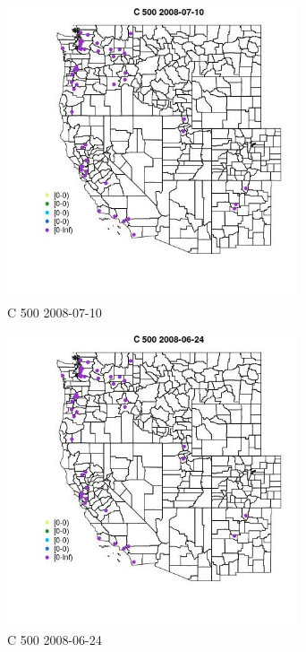 \begin{figure} 
\centering  
\includegraphics[width=0.77\textwidth]{Code_Outputs/Report_ML_input_PM25_Step4_part_e_de_duplicated_aves_MapObsC_5002008-07-10.jpg} 
\caption{\label{fig:Report_ML_input_PM25_Step4_part_e_de_duplicated_avesMapObsC_5002008-07-10}C 500 2008-07-10} 
\end{figure} 
 

\clearpage 

\begin{figure} 
\centering  
\includegraphics[width=0.77\textwidth]{Code_Outputs/Report_ML_input_PM25_Step4_part_e_de_duplicated_aves_MapObsC_5002008-06-24.jpg} 
\caption{\label{fig:Report_ML_input_PM25_Step4_part_e_de_duplicated_avesMapObsC_5002008-06-24}C 500 2008-06-24} 
\end{figure} 
 

